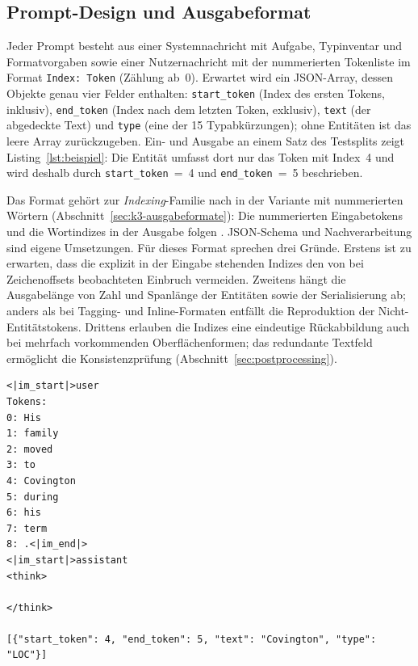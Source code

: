 \subsection{Prompt-Design und Ausgabeformat}
\label{sec:prompt-design}

Jeder Prompt besteht aus einer Systemnachricht mit Aufgabe, Typinventar
und Formatvorgaben sowie einer Nutzernachricht mit der nummerierten
Tokenliste im Format \texttt{Index: Token} (Zählung ab~0).
Erwartet wird ein JSON-Array, dessen Objekte genau vier Felder
enthalten: \texttt{start\_token} (Index des ersten Tokens, inklusiv),
\texttt{end\_token} (Index nach dem letzten Token, exklusiv),
\texttt{text} (der abgedeckte Text) und \texttt{type} (eine der 15
Typabkürzungen); ohne Entitäten ist das leere Array zurückzugeben.
Ein- und Ausgabe an einem Satz des Testsplits zeigt
Listing~\ref{lst:beispiel}: Die Entität umfasst dort nur das Token mit
Index~4 und wird deshalb durch \texttt{start\_token}~=~4 und
\texttt{end\_token}~=~5 beschrieben.

Das Format gehört zur \emph{Indexing}-Familie nach
\textcite[Abschn.~3.2]{semin2026spanLabeling} in der Variante mit
nummerierten Wörtern (Abschnitt~\ref{sec:k3-ausgabeformate}): Die
nummerierten Eingabetokens und die Wortindizes in der Ausgabe folgen
\textcite[Tab.~9]{ramponi2025fallacy}. JSON-Schema und Nachverarbeitung
sind eigene Umsetzungen.
Für dieses Format sprechen drei Gründe.
Erstens ist zu erwarten, dass die explizit in der Eingabe stehenden
Indizes den von \textcite{zhan2026generativeNER} bei Zeichenoffsets
beobachteten Einbruch vermeiden.
Zweitens hängt die Ausgabelänge von Zahl und Spanlänge der Entitäten
sowie der Serialisierung ab; anders als bei Tagging- und Inline-Formaten
entfällt die Reproduktion der Nicht-Entitätstokens.
Drittens erlauben die Indizes eine eindeutige Rückabbildung auch bei
mehrfach vorkommenden Oberflächenformen; das redundante Textfeld
ermöglicht die Konsistenzprüfung (Abschnitt~\ref{sec:postprocessing}).

\begin{lstlisting}[basicstyle=\ttfamily\scriptsize, columns=fullflexible,
  keepspaces=true, frame=single, captionpos=b, float=htbp,
  caption={Nutzernachricht, Beginn der Assistentenantwort mit leerem
  Denkblock und Zielantwort (letzte Zeile) für einen Satz des Testsplits;
  ohne Systemnachricht (Listing~\ref{lst:prompt-task}).},
  label={lst:beispiel}]
<|im_start|>user
Tokens:
0: His
1: family
2: moved
3: to
4: Covington
5: during
6: his
7: term
8: .<|im_end|>
<|im_start|>assistant
<think>

</think>

[{"start_token": 4, "end_token": 5, "text": "Covington", "type": "LOC"}]
\end{lstlisting}

